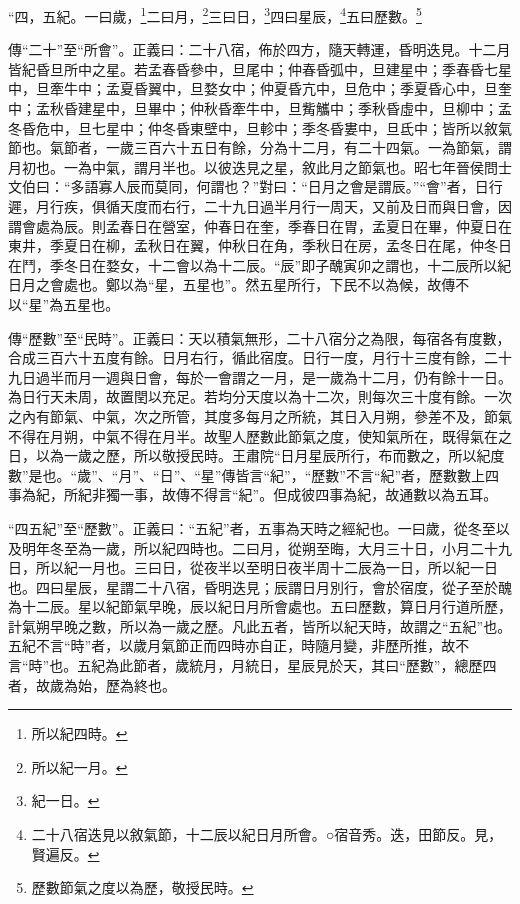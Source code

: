“四，五紀。一曰歲，\footnote{所以紀四時。}二曰月，\footnote{所以紀一月。}三曰日，\footnote{紀一日。}四曰星辰，\footnote{二十八宿迭見以敘氣節，十二辰以紀日月所會。○宿音秀。迭，田節反。見，賢遍反。}五曰歷數。\footnote{歷數節氣之度以為歷，敬授民時。}

{\noindent\zhuan{}\fzbyks 傳“二十”至“所會”。正義曰：二十八宿，佈於四方，隨天轉運，昏明迭見。十二月皆紀昏旦所中之星。若孟春昏參中，旦尾中；仲春昏弧中，旦建星中；季春昏七星中，旦牽牛中；孟夏昏翼中，旦婺女中；仲夏昏亢中，旦危中；季夏昏心中，旦奎中；孟秋昏建星中，旦畢中；仲秋昏牽牛中，旦觜觿中；季秋昏虛中，旦柳中；孟冬昏危中，旦七星中；仲冬昏東壁中，旦軫中；季冬昏婁中，旦氐中；皆所以敘氣節也。氣節者，一歲三百六十五日有餘，分為十二月，有二十四氣。一為節氣，謂月初也。一為中氣，謂月半也。以彼迭見之星，敘此月之節氣也。昭七年晉侯問士文伯曰：“多語寡人辰而莫同，何謂也？”對曰：“日月之會是謂辰。”“會”者，日行遲，月行疾，俱循天度而右行，二十九日過半月行一周天，又前及日而與日會，因謂會處為辰。則孟春日在營室，仲春日在奎，季春日在胃，孟夏日在畢，仲夏日在東井，季夏日在柳，孟秋日在翼，仲秋日在角，季秋日在房，孟冬日在尾，仲冬日在鬥，季冬日在婺女，十二會以為十二辰。“辰”即子醜寅卯之謂也，十二辰所以紀日月之會處也。鄭以為“星，五星也”。然五星所行，下民不以為候，故傳不以“星”為五星也。 \par}

{\noindent\zhuan{}\fzbyks 傳“歷數”至“民時”。正義曰：天以積氣無形，二十八宿分之為限，每宿各有度數，合成三百六十五度有餘。日月右行，循此宿度。日行一度，月行十三度有餘，二十九日過半而月一週與日會，每於一會謂之一月，是一歲為十二月，仍有餘十一日。為日行天未周，故置閏以充足。若均分天度以為十二次，則每次三十度有餘。一次之內有節氣、中氣，次之所管，其度多每月之所統，其日入月朔，參差不及，節氣不得在月朔，中氣不得在月半。故聖人歷數此節氣之度，使知氣所在，既得氣在之日，以為一歲之歷，所以敬授民時。王肅院“日月星辰所行，布而數之，所以紀度數”是也。“歲”、“月”、“日”、“星”傳皆言“紀”，“歷數”不言“紀”者，歷數數上四事為紀，所紀非獨一事，故傳不得言“紀”。但成彼四事為紀，故通數以為五耳。 \par}

{\noindent\shu{}\fzkt “四五紀”至“歷數”。正義曰：“五紀”者，五事為天時之經紀也。一曰歲，從冬至以及明年冬至為一歲，所以紀四時也。二曰月，從朔至晦，大月三十日，小月二十九日，所以紀一月也。三曰日，從夜半以至明日夜半周十二辰為一日，所以紀一日也。四曰星辰，星謂二十八宿，昏明迭見；辰謂日月別行，會於宿度，從子至於醜為十二辰。星以紀節氣早晚，辰以紀日月所會處也。五曰歷數，算日月行道所歷，計氣朔早晚之數，所以為一歲之歷。凡此五者，皆所以紀天時，故謂之“五紀”也。五紀不言“時”者，以歲月氣節正而四時亦自正，時隨月變，非歷所推，故不言“時”也。五紀為此節者，歲統月，月統日，星辰見於天，其曰“歷數”，總歷四者，故歲為始，歷為終也。 \par}

